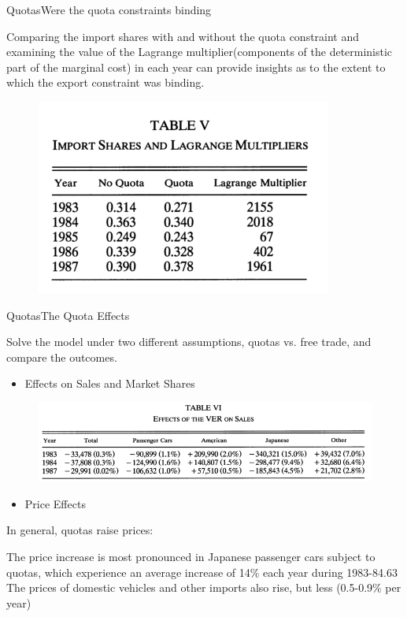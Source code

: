 \documentclass{beamer}
\begin{document}
\begin{frame}{Quotas}{Were the quota constraints binding}

   Comparing the import shares with and without the quota constraint and examining the value of the Lagrange multiplier(components of the deterministic part of the marginal cost) in each year can provide insights as to the extent to which the export constraint was binding.

   \begin{figure}[h]
	   \centering          			
	   \includegraphics[scale=1.4]{table5.png}
	   \end{figure} 
\end{frame}	



\begin{frame}{Quotas}{The Quota Effects}

  Solve the model under two different assumptions, quotas vs. free trade, and compare the outcomes.

   \begin{itemize}
	   \item  Effects on Sales and Market Shares
	  
	 \end{itemize}

   \begin{figure}[h]
	   \centering          			
	   \includegraphics[scale=1.0]{table6.png}
	   \end{figure} 

	   \begin{itemize}
	   \item  Price Effects
   \end{itemize}

	In general, quotas raise prices:
	   
   The price increase is most pronounced in Japanese passenger cars subject to quotas, which experience an average increase of 14\% each year during 1983-84.63 The prices of domestic vehicles and other imports also rise, but less (0.5-0.9\% per year)
\end{frame}	
\end{document}
